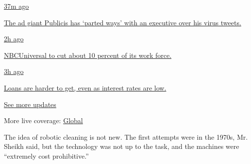 \href{https://www.nytimes3xbfgragh.onion/live/2020/08/04/business/stock-market-today-coronavirus?action=click\&pgtype=Article\&state=default\&region=MAIN_CONTENT_1\&context=storylines_live_updates\#the-ad-giant-publicis-has-parted-ways-with-an-executive-over-his-virus-tweets}{37m
ago}

\href{https://www.nytimes3xbfgragh.onion/live/2020/08/04/business/stock-market-today-coronavirus?action=click\&pgtype=Article\&state=default\&region=MAIN_CONTENT_1\&context=storylines_live_updates\#the-ad-giant-publicis-has-parted-ways-with-an-executive-over-his-virus-tweets}{The
ad giant Publicis has `parted ways' with an executive over his virus
tweets.}

\href{https://www.nytimes3xbfgragh.onion/live/2020/08/04/business/stock-market-today-coronavirus?action=click\&pgtype=Article\&state=default\&region=MAIN_CONTENT_1\&context=storylines_live_updates\#nbcuniversal-to-cut-about-10-percent-of-its-work-force}{2h
ago}

\href{https://www.nytimes3xbfgragh.onion/live/2020/08/04/business/stock-market-today-coronavirus?action=click\&pgtype=Article\&state=default\&region=MAIN_CONTENT_1\&context=storylines_live_updates\#nbcuniversal-to-cut-about-10-percent-of-its-work-force}{NBCUniversal
to cut about 10 percent of its work force.}

\href{https://www.nytimes3xbfgragh.onion/live/2020/08/04/business/stock-market-today-coronavirus?action=click\&pgtype=Article\&state=default\&region=MAIN_CONTENT_1\&context=storylines_live_updates\#loans-are-harder-to-get-even-as-interest-rates-are-low}{3h
ago}

\href{https://www.nytimes3xbfgragh.onion/live/2020/08/04/business/stock-market-today-coronavirus?action=click\&pgtype=Article\&state=default\&region=MAIN_CONTENT_1\&context=storylines_live_updates\#loans-are-harder-to-get-even-as-interest-rates-are-low}{Loans
are harder to get, even as interest rates are low.}

\href{https://www.nytimes3xbfgragh.onion/live/2020/08/04/business/stock-market-today-coronavirus?action=click\&pgtype=Article\&state=default\&region=MAIN_CONTENT_1\&context=storylines_live_updates}{See
more updates}

More live coverage:
\href{https://www.nytimes3xbfgragh.onion/2020/08/04/world/coronavirus-cases.html?action=click\&pgtype=Article\&state=default\&region=MAIN_CONTENT_1\&context=storylines_live_updates}{Global}

The idea of robotic cleaning is not new. The first attempts were in the
1970s, Mr. Sheikh said, but the technology was not up to the task, and
the machines were ``extremely cost prohibitive.''

